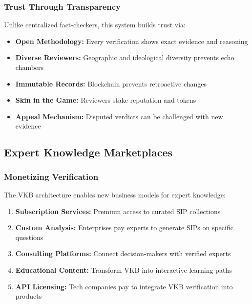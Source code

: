\documentclass[11pt,a4paper]{article}
\theoremstyle{definition}
\theoremstyle{remark}
\newcommand{\VKB}{\textsc{VKB}}
\newcommand{\SIP}{\textsc{SIP}}
\begin{document}
\subsubsection{Trust Through Transparency}

Unlike centralized fact-checkers, this system builds trust via:
\begin{itemize}
    \item \textbf{Open Methodology:} Every verification shows exact evidence and reasoning
    \item \textbf{Diverse Reviewers:} Geographic and ideological diversity prevents echo chambers
    \item \textbf{Immutable Records:} Blockchain prevents retroactive changes
    \item \textbf{Skin in the Game:} Reviewers stake reputation and tokens
    \item \textbf{Appeal Mechanism:} Disputed verdicts can be challenged with new evidence
\end{itemize}

\subsection{Expert Knowledge Marketplaces}

\subsubsection{Monetizing Verification}

The \VKB{} architecture enables new business models for expert knowledge:

\begin{enumerate}
    \item \textbf{Subscription Services:} Premium access to curated \SIP{} collections
    \item \textbf{Custom Analysis:} Enterprises pay experts to generate \SIP{}s on specific questions
    \item \textbf{Consulting Platforms:} Connect decision-makers with verified experts
    \item \textbf{Educational Content:} Transform \VKB{} into interactive learning paths
    \item \textbf{API Licensing:} Tech companies pay to integrate \VKB{} verification into products
\end{enumerate}
\end{document}
